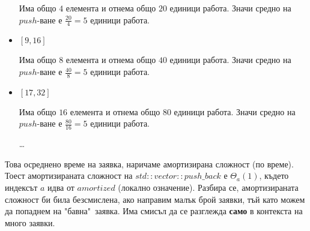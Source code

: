 \begin{examplecp}
\begin{itemize}
		Има общо $4$ елемента и отнема общо $20$ единици работа. Значи средно на $push$-ване е $\frac{20}4=5$ единици работа.
		
		\item $[9,16]$
		
		Има общо $8$ елемента и отнема общо $40$ единици работа. Значи средно на $push$-ване е $\frac{40}8=5$ единици работа.
		
		\item $[17,32]$
		
		Има общо $16$ елемента и отнема общо $80$ единици работа. Значи средно на $push$-ване е $\frac{80}{16}=5$ единици работа.
		
		\begin{center}
			\dots
		\end{center}
	\end{itemize}
	
	\noindent
	Това осреднено време на заявка, наричаме амортизирана сложност (по време). Тоест амортизираната сложност на $std::vector::push\_back$ е $\Theta_{a}(1)$, където индексът $a$ идва от $amortized$ (локално означение). Разбира се, амортизираната сложност би била безсмислена, ако направим малък брой заявки, тъй като можем да попаднем на "бавна"\ заявка. Има смисъл да се разглежда \textbf{само} в контекста на много заявки.
\end{examplecp}